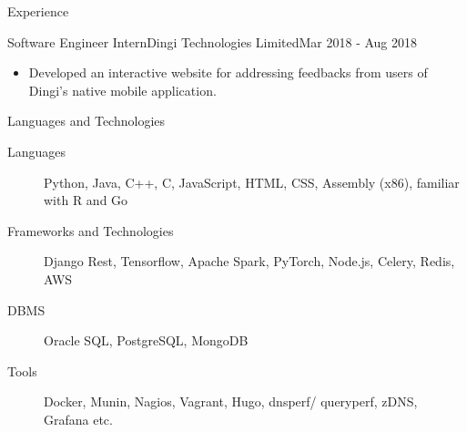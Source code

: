 \documentclass[]{mcdowellcv}
\begin{document}
\begin{cvsection}{Experience}
		\begin{cvsubsection}{Software Engineer Intern}{Dingi Technologies Limited}{Mar 2018 - Aug 2018}
			\begin{itemize}
				\item Developed an interactive website for addressing feedbacks from users of Dingi's native mobile application.
			\end{itemize}
		\end{cvsubsection}
	\end{cvsection}

	\begin{cvsection}{Languages and Technologies}
		\begin{cvsubsection}{}{}{}
			\begin{description}
				\item[Languages] Python, Java, C++, C, JavaScript, HTML, CSS, Assembly (x86), familiar with R and Go
				\item[Frameworks and Technologies] Django Rest, Tensorflow, Apache Spark, PyTorch, Node.js, Celery, Redis, AWS
				\item[DBMS] Oracle SQL, PostgreSQL, MongoDB
				\item[Tools] Docker, Munin, Nagios, Vagrant, Hugo, dnsperf/ queryperf, zDNS, Grafana etc.
			\end{description}
		\end{cvsubsection}
	\end{cvsection}
\end{document}
